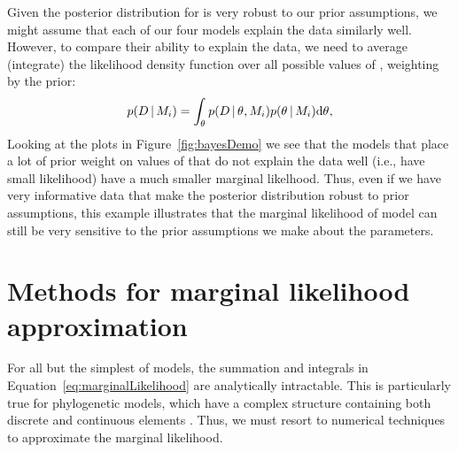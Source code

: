 \begin{linenomath}
Given the posterior distribution for \probheads is very robust to our prior
assumptions, we might assume that each of our four models explain the data
similarly well.
However, to compare their ability to explain the data, we need to
average (integrate) the likelihood density function over all possible
values of \probheads, weighting by the prior:
\begin{equation}
    p(\data \given \model[i]) =
    \int_{\probheads}
    p( \data \given \probheads, \model[i])
    p(\probheads \given \model[i])
    \diff{\probheads},
    \label{eq:coinMarginalLikelihood}
\end{equation}
Looking at the plots in Figure~\ref{fig:bayesDemo} we see that the models that
place a lot of prior weight on values of \probheads that do not explain the
data well (i.e., have small likelihood) have a much smaller marginal likelhood.
Thus, even if we have very informative data that make the posterior
distribution robust to prior assumptions, this example illustrates that the
marginal likelihood of model can still be very sensitive to the prior
assumptions we make about the parameters.
\end{linenomath}


\section{Methods for marginal likelihood approximation}

For all but the simplest of models, the summation and integrals in
Equation~\ref{eq:marginalLikelihood}
are analytically intractable.
This is particularly true for phylogenetic models, which have a complex
structure containing both discrete and continuous elements \citep{Kim2000}.
Thus, we must resort to numerical techniques to approximate the marginal
likelihood.

